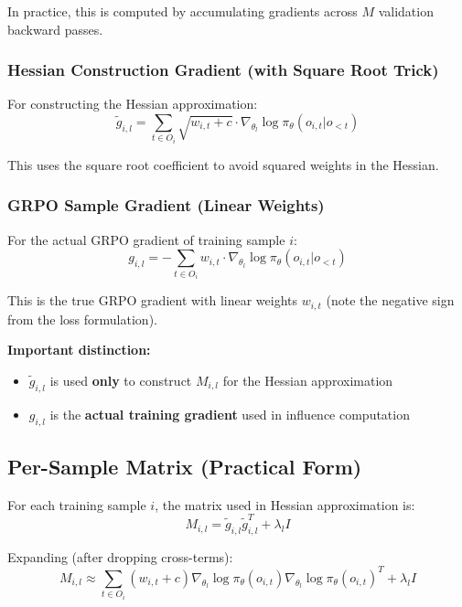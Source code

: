 \documentclass{article}
\begin{document}
In practice, this is computed by accumulating gradients across $M$ validation backward passes.

\subsubsection{Hessian Construction Gradient (with Square Root Trick)}

For constructing the Hessian approximation:
\begin{equation}
\tilde{g}_{i,l} = \sum_{t \in O_i} \sqrt{w_{i,t} + c} \cdot \nabla_{\theta_l}\log\pi_\theta(o_{i,t}|o_{<t})
\end{equation}

This uses the square root coefficient to avoid squared weights in the Hessian.

\subsubsection{GRPO Sample Gradient (Linear Weights)}

For the actual GRPO gradient of training sample $i$:
\begin{equation}
g_{i,l} = -\sum_{t \in O_i} w_{i,t} \cdot \nabla_{\theta_l}\log\pi_\theta(o_{i,t}|o_{<t})
\end{equation}

This is the true GRPO gradient with linear weights $w_{i,t}$ (note the negative sign from the loss formulation).

\textbf{Important distinction:} 
\begin{itemize}
    \item $\tilde{g}_{i,l}$ is used \textbf{only} to construct $M_{i,l}$ for the Hessian approximation
    \item $g_{i,l}$ is the \textbf{actual training gradient} used in influence computation
\end{itemize}

\subsection{Per-Sample Matrix (Practical Form)}

For each training sample $i$, the matrix used in Hessian approximation is:
\begin{equation}
M_{i,l} = \tilde{g}_{i,l}\tilde{g}_{i,l}^T + \lambda_l I
\end{equation}

Expanding (after dropping cross-terms):
\begin{equation}
M_{i,l} \approx \sum_{t \in O_i} (w_{i,t}+c)\nabla_{\theta_l}\log\pi_\theta(o_{i,t})\nabla_{\theta_l}\log\pi_\theta(o_{i,t})^T + \lambda_l I
\end{equation}
\end{document}
